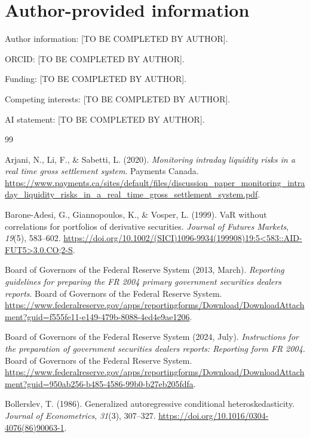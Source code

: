 \documentclass[11pt,a4paper]{article}
\begin{document}
\section*{Author-provided information}
Author information: [TO BE COMPLETED BY AUTHOR].\par
ORCID: [TO BE COMPLETED BY AUTHOR].\par
Funding: [TO BE COMPLETED BY AUTHOR].\par
Competing interests: [TO BE COMPLETED BY AUTHOR].\par
AI statement: [TO BE COMPLETED BY AUTHOR].

\begin{thebibliography}{99}
\raggedright
{} Arjani, N., Li, F., \& Sabetti, L. (2020). \emph{Monitoring intraday liquidity risks in a real time gross settlement system}. Payments Canada. \url{https://www.payments.ca/sites/default/files/discussion_paper_monitoring_intraday_liquidity_risks_in_a_real_time_gross_settlement_system.pdf}.

 Barone-Adesi, G., Giannopoulos, K., \& Vosper, L. (1999). VaR without correlations for portfolios of derivative securities. \emph{Journal of Futures Markets}, \emph{19}(5), 583--602. \url{https://doi.org/10.1002/(SICI)1096-9934(199908)19:5<583::AID-FUT5>3.0.CO;2-S}.

 Board of Governors of the Federal Reserve System (2013, March). \emph{Reporting guidelines for preparing the FR 2004 primary government securities dealers reports}. Board of Governors of the Federal Reserve System. \url{https://www.federalreserve.gov/apps/reportingforms/Download/DownloadAttachment?guid=f555fe11-e149-479b-8088-4ed4e9ae1206}.

 Board of Governors of the Federal Reserve System (2024, July). \emph{Instructions for the preparation of government securities dealers reports: Reporting form FR 2004}. Board of Governors of the Federal Reserve System. \url{https://www.federalreserve.gov/apps/reportingforms/Download/DownloadAttachment?guid=950ab256-b485-4586-99b0-b27eb205fdfa}.

 Bollerslev, T. (1986). Generalized autoregressive conditional heteroskedasticity. \emph{Journal of Econometrics}, \emph{31}(3), 307--327. \url{https://doi.org/10.1016/0304-4076(86)90063-1}.


\end{thebibliography}
\end{document}
